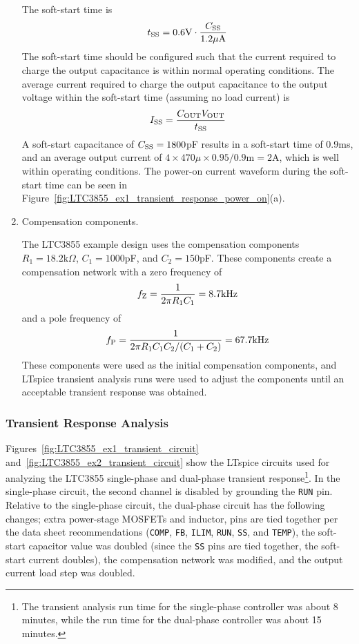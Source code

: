 \begin{enumerate}
The soft-start time is 
%
\begin{equation}
t_{\rm SS} = 0.6\text{V}\cdot\frac{C_{\rm SS}}{1.2\mu\text{A}}
\end{equation}
%
The soft-start time should be configured such that the current 
required to charge the output capacitance is within normal
operating conditions. The average current required to charge
the output capacitance to the output voltage within the
soft-start time (assuming no load current) is
%
\begin{equation}
I_{\rm SS} = \frac{C_{\rm OUT}V_{\rm OUT}}{t_{\rm SS}}
\end{equation}
%
A soft-start capacitance of $C_{\rm SS} = 1800$pF results in a
soft-start time of 0.9ms, and an average output current
of $4\times470\mu\times0.95/0.9\text{m} = 2$A, which is
well within operating conditions. The power-on current
waveform during the soft-start time can be seen in 
Figure~\ref{fig:LTC3855_ex1_transient_response_power_on}(a).

\item Compensation components.

The LTC3855 example design uses the compensation components
$R_1  = 18.2\text{k}\Omega$, $C_1 = 1000$pF, and
$C_2 = 150$pF. These components create a compensation
network with a zero frequency of
%
\begin{equation}
f_{\rm Z} = \frac{1}{2\pi R_1 C_1} = 8.7\text{kHz}
\end{equation}
%
and a pole frequency of
%
\begin{equation}
f_{\rm P} = \frac{1}{2\pi R_1 C_1C_2/(C_1+C_2)}
= 67.7\text{kHz}
\end{equation}
%
These components were used as the initial compensation components,
and LTspice transient analysis runs were used to adjust the 
components until an acceptable transient response was obtained.
\end{enumerate}


\clearpage
\subsubsection{Transient Response Analysis}

Figures~\ref{fig:LTC3855_ex1_transient_circuit} 
and~\ref{fig:LTC3855_ex2_transient_circuit} show the LTspice circuits
used for analyzing the LTC3855 single-phase and dual-phase transient
response\footnote{The transient analysis run time for the
single-phase controller was about 8 minutes, while the run time
for the dual-phase controller was about 15 minutes.}.
In the single-phase circuit, the second channel is disabled
by grounding the \verb+RUN+ pin. Relative to the single-phase
circuit, the dual-phase circuit has the following changes;
extra power-stage MOSFETs and inductor, pins are tied together
per the data sheet recommendations (\verb+COMP+, \verb+FB+, 
\verb+ILIM+, \verb+RUN+, \verb+SS+, and \verb+TEMP+), the soft-start
capacitor value was doubled (since the \verb+SS+ pins are tied
together, the soft-start current doubles), the compensation 
network was modified, and the output current load step was
doubled.

